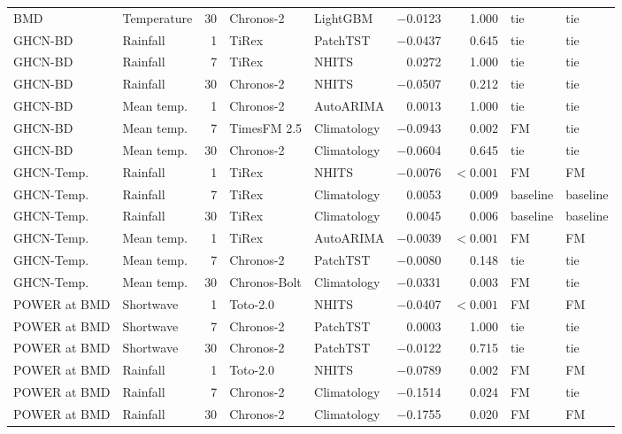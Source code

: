 \begin{table}[htbp]
\begin{tabular}{llrllrrll}
    BMD & Temperature & 30 & Chronos-2 & LightGBM & \num{-0.0123} & \num{1.000} & tie & tie \\
    GHCN-BD & Rainfall & 1 & TiRex & PatchTST & \num{-0.0437} & \num{0.645} & tie & tie \\
    GHCN-BD & Rainfall & 7 & TiRex & NHITS & \num{+0.0272} & \num{1.000} & tie & tie \\
    GHCN-BD & Rainfall & 30 & Chronos-2 & NHITS & \num{-0.0507} & \num{0.212} & tie & tie \\
    GHCN-BD & Mean temp. & 1 & Chronos-2 & AutoARIMA & \num{+0.0013} & \num{1.000} & tie & tie \\
    GHCN-BD & Mean temp. & 7 & TimesFM 2.5 & Climatology & \num{-0.0943} & \num{0.002} & FM & tie \\
    GHCN-BD & Mean temp. & 30 & Chronos-2 & Climatology & \num{-0.0604} & \num{0.645} & tie & tie \\
    GHCN-Temp. & Rainfall & 1 & TiRex & NHITS & \num{-0.0076} & $<\num{0.001}$ & FM & FM \\
    GHCN-Temp. & Rainfall & 7 & TiRex & Climatology & \num{+0.0053} & \num{0.009} & baseline & baseline \\
    GHCN-Temp. & Rainfall & 30 & TiRex & Climatology & \num{+0.0045} & \num{0.006} & baseline & baseline \\
    GHCN-Temp. & Mean temp. & 1 & TiRex & AutoARIMA & \num{-0.0039} & $<\num{0.001}$ & FM & FM \\
    GHCN-Temp. & Mean temp. & 7 & Chronos-2 & PatchTST & \num{-0.0080} & \num{0.148} & tie & tie \\
    GHCN-Temp. & Mean temp. & 30 & Chronos-Bolt & Climatology & \num{-0.0331} & \num{0.003} & FM & tie \\
    POWER at BMD & Shortwave & 1 & Toto-2.0 & NHITS & \num{-0.0407} & $<\num{0.001}$ & FM & FM \\
    POWER at BMD & Shortwave & 7 & Chronos-2 & PatchTST & \num{+0.0003} & \num{1.000} & tie & tie \\
    POWER at BMD & Shortwave & 30 & Chronos-2 & PatchTST & \num{-0.0122} & \num{0.715} & tie & tie \\
    POWER at BMD & Rainfall & 1 & Toto-2.0 & NHITS & \num{-0.0789} & \num{0.002} & FM & FM \\
    POWER at BMD & Rainfall & 7 & Chronos-2 & Climatology & \num{-0.1514} & \num{0.024} & FM & tie \\
    POWER at BMD & Rainfall & 30 & Chronos-2 & Climatology & \num{-0.1755} & \num{0.020} & FM & FM \\

\end{tabular}
\end{table}
